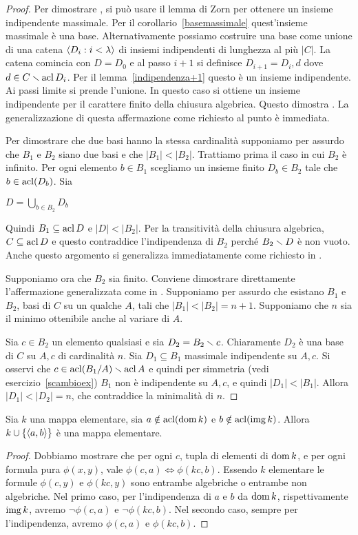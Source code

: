 \begin{proof}
Per dimostrare , si pu\`o usare il lemma di Zorn per ottenere un insieme indipendente massimale. Per il corollario~\ref{basemassimale} quest'insieme massimale \`e una base. Alternativamente possiamo costruire una base come unione di una catena $\langle D_i:i<\lambda\rangle$ di insiemi indipendenti di lunghezza al pi\`u $|C|$. La catena comincia con $D=D_0$ e al passo $i+1$ si definisce $D_{i+1}=D_i,d$ dove $d\in C\smallsetminus\mathop{\rm acl} D_i$. Per il lemma~\ref{indipendenza+1} questo \`e un insieme indipendente. Ai passi limite si prende l'unione. In questo caso si ottiene un insieme indipendente per il carattere finito della chiusura algebrica. Questo dimostra . La generalizzazione di questa affermazione come richiesto al punto  \`e immediata.

Per dimostrare che due basi hanno la stessa cardinalit\`a supponiamo per assurdo che $B_1$ e $B_2$ siano due basi e che $|B_1|<|B_2|$. Trattiamo prima il caso in cui $B_2$  \`e infinito. Per ogni elemento $b\in B_1$ scegliamo un insieme finito $D_b\in B_2$ tale che $b\in\mathop{\rm acl}(D_b)$. Sia

\hfil$\displaystyle D=\bigcup_{b\in B_2}D_b$

Quindi $B_1\subseteq\mathop{\rm acl} D$ e $|D|<|B_2|$. Per la transitivit\`a della chiusura algebrica, $C\subseteq\mathop{\rm acl} D$ e questo contraddice l'indipendenza di $B_2$ perch\'e $B_2\smallsetminus D$ \`e non vuoto. Anche questo argomento si generalizza immediatamente come richiesto in . 

Supponiamo ora che $B_2$ sia finito. Conviene dimostrare direttamente l'affermazione generalizzata come in . Supponiamo per assurdo che esistano $B_1$ e $B_2$, basi di $C$ su un qualche $A$, tali che $|B_1|<|B_2|=n+1$. Supponiamo che $n$ sia il minimo ottenibile anche al variare di $A$. 

Sia $c\in B_2$ un elemento qualsiasi e sia $D_2=B_2\smallsetminus c$. Chiaramente $D_2$ \`e una base di $C$ su $A, c$ di cardinalit\`a $n$. Sia $D_1\subseteq B_1$ massimale indipendente su $A,c$. Si osservi che $c\in\mathop{\rm acl}(B_1/A)\smallsetminus\mathop{\rm acl} A$ e quindi per simmetria (vedi esercizio~\ref{scambioex}) $B_1$ non \`e indipendente su $A,c$, e quindi $|D_1|<|B_1|$. Allora $|D_1|<|D_2|=n$, che contraddice  la minimalit\`a di $n$.
\end{proof}

\begin{theorem}\label{mappetraindipendenti} 
Sia $k$ una mappa elementare, sia $a\notin\mathop{\rm acl}(\mathop{\rm dom} k)$ e $b\notin\mathop{\rm acl}(\mathop{\rm img} k)$. Allora $k\cup\{\langle a,b\rangle\}$ \`e una mappa elementare.
\end{theorem}
\begin{proof}
Dobbiamo mostrare che per ogni $c$, tupla di elementi di $\mathop{\rm dom} k$, e per ogni formula pura $\phi(x,y)$, vale $\phi(c,a)\iff\phi(kc,b)$. Essendo $k$ elementare le formule $\phi(c,y)$ e  $\phi(kc,y)$ sono entrambe algebriche o entrambe non algebriche. Nel primo caso, per l'indipendenza di $a$ e $b$ da $\mathop{\rm dom} k$, rispettivamente $\mathop{\rm img} k$, avremo  $\neg\phi(c,a)$ e $\neg\phi(kc,b)$. Nel secondo caso, sempre per l'indipendenza, avremo $\phi(c,a)$ e $\phi(kc,b)$.
\end{proof}

